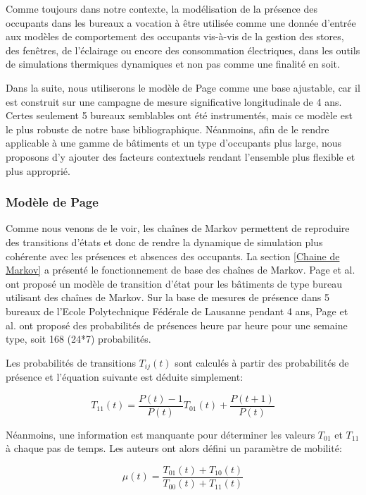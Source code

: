 Comme toujours dans notre contexte, la modélisation de la présence des occupants dans les bureaux a vocation à être utilisée comme une donnée d'entrée aux modèles de comportement des occupants vis-à-vis de la gestion des stores, des fenêtres, de l'éclairage ou encore des consommation électriques, dans les outils de simulations thermiques dynamiques et non pas comme une finalité en soit.

Dans la suite, nous utiliserons le modèle de Page comme une base ajustable, car il est construit sur une campagne de mesure significative longitudinale de 4 ans. Certes seulement 5 bureaux semblables ont été instrumentés, mais ce modèle est le plus robuste de notre base bibliographique. Néanmoins, afin de le rendre applicable à une gamme de bâtiments et un type d'occupants plus large, nous proposons d'y ajouter des facteurs contextuels rendant l'ensemble plus flexible et plus approprié.

\subsubsection{Modèle de Page}

Comme nous venons de le voir, les chaînes de Markov permettent de reproduire des transitions d'états et donc de rendre la dynamique de simulation plus cohérente avec les présences et absences des occupants. La section \ref{Chaine de Markov} a présenté le fonctionnement de base des chaînes de Markov. Page et al. \cite{Page-08} ont proposé un modèle de transition d'état pour les bâtiments de type bureau utilisant des chaînes de Markov. Sur la base de mesures de présence dans 5 bureaux de l'Ecole Polytechnique Fédérale de Lausanne pendant 4 ans, Page et al. ont proposé des probabilités de présences heure par heure pour une semaine type, soit 168 (24*7) probabilités. 

Les probabilités de transitions $T_{ij}(t)$ sont calculés à partir des probabilités de présence et l'équation suivante est déduite simplement:

\begin{equation}
T_{11}(t)=\dfrac{P(t)-1}{P(t)}T_{01}(t)+\dfrac{P(t+1)}{P(t)}
\label{T110}
\end{equation}

Néanmoins, une information est manquante pour déterminer les valeurs $T_{01}$ et $T_{11}$ à chaque pas de temps. Les auteurs ont alors défini un paramètre de mobilité:

\begin{equation}
\mu(t)=\dfrac{T_{01}(t)+T_{10}(t)}{T_{00}(t)+T_{11}(t)}
\label{mu}
\end{equation}

